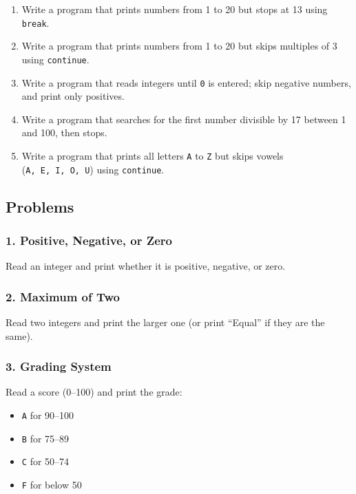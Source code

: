\documentclass[
  letterpaper,
  DIV=11,
  numbers=noendperiod]{scrreprt}
\providecommand{\tightlist}{%
  \setlength{\itemsep}{0pt}\setlength{\parskip}{0pt}}
\begin{document}
\begin{enumerate}
\def\labelenumi{\arabic{enumi}.}
\tightlist
\item
  Write a program that prints numbers from 1 to 20 but stops at 13 using
  \texttt{break}.
\item
  Write a program that prints numbers from 1 to 20 but skips multiples
  of 3 using \texttt{continue}.
\item
  Write a program that reads integers until \texttt{0} is entered; skip
  negative numbers, and print only positives.
\item
  Write a program that searches for the first number divisible by 17
  between 1 and 100, then stops.
\item
  Write a program that prints all letters \texttt{A} to \texttt{Z} but
  skips vowels (\texttt{A,\ E,\ I,\ O,\ U}) using \texttt{continue}.
\end{enumerate}

\subsection{Problems}\label{problems-2}

\subsubsection{1. Positive, Negative, or
Zero}\label{positive-negative-or-zero}

Read an integer and print whether it is positive, negative, or zero.

\subsubsection{2. Maximum of Two}\label{maximum-of-two}

Read two integers and print the larger one (or print ``Equal'' if they
are the same).

\subsubsection{3. Grading System}\label{grading-system}

Read a score (0--100) and print the grade:

\begin{itemize}
\tightlist
\item
  \texttt{A} for 90--100
\item
  \texttt{B} for 75--89
\item
  \texttt{C} for 50--74
\item
  \texttt{F} for below 50
\end{itemize}
\end{document}
